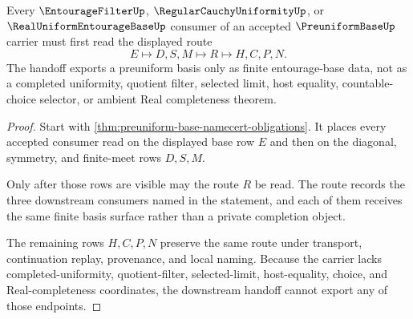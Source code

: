 \begin{theorem}
\label{thm:preuniform-base-downstream-handoff}
Every $\EntourageFilterUp$, $\RegularCauchyUniformityUp$, or $\RealUniformEntourageBaseUp$ consumer of an accepted $\PreuniformBaseUp$ carrier must first read the displayed route
$$
E\longmapsto D,S,M\longmapsto R\longmapsto H,C,P,N.
$$
The handoff exports a preuniform basis only as finite entourage-base data, not as a completed uniformity, quotient filter, selected limit, host equality, countable-choice selector, or ambient Real completeness theorem.
\end{theorem}
\begin{proof}
Start with \autoref{thm:preuniform-base-namecert-obligations}. It places every accepted consumer read on the displayed base row $E$ and then on the diagonal, symmetry, and finite-meet rows $D,S,M$.

Only after those rows are visible may the route $R$ be read. The route records the three downstream consumers named in the statement, and each of them receives the same finite basis surface rather than a private completion object.

The remaining rows $H,C,P,N$ preserve the same route under transport, continuation replay, provenance, and local naming. Because the carrier lacks completed-uniformity, quotient-filter, selected-limit, host-equality, choice, and Real-completeness coordinates, the downstream handoff cannot export any of those endpoints.
\end{proof}




